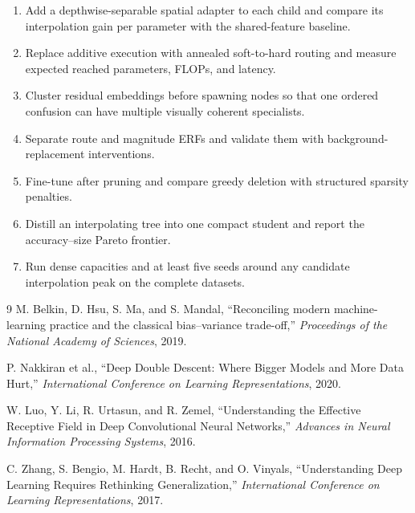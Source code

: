 \documentclass[11pt,a4paper]{article}
\begin{document}
\begin{enumerate}
  \item Add a depthwise-separable spatial adapter to each child and compare its
  interpolation gain per parameter with the shared-feature baseline.
  \item Replace additive execution with annealed soft-to-hard routing and
  measure expected reached parameters, FLOPs, and latency.
  \item Cluster residual embeddings before spawning nodes so that one ordered
  confusion can have multiple visually coherent specialists.
  \item Separate route and magnitude ERFs and validate them with
  background-replacement interventions.
  \item Fine-tune after pruning and compare greedy deletion with structured
  sparsity penalties.
  \item Distill an interpolating tree into one compact student and report the
  accuracy--size Pareto frontier.
  \item Run dense capacities and at least five seeds around any candidate
  interpolation peak on the complete datasets.
\end{enumerate}

\begin{thebibliography}{9}
M. Belkin, D. Hsu, S. Ma, and S. Mandal,
``Reconciling modern machine-learning practice and the classical
bias--variance trade-off,'' \emph{Proceedings of the National Academy of
Sciences}, 2019.

P. Nakkiran et al.,
``Deep Double Descent: Where Bigger Models and More Data Hurt,''
\emph{International Conference on Learning Representations}, 2020.

W. Luo, Y. Li, R. Urtasun, and R. Zemel,
``Understanding the Effective Receptive Field in Deep Convolutional Neural
Networks,'' \emph{Advances in Neural Information Processing Systems}, 2016.

C. Zhang, S. Bengio, M. Hardt, B. Recht, and O. Vinyals,
``Understanding Deep Learning Requires Rethinking Generalization,''
\emph{International Conference on Learning Representations}, 2017.
\end{thebibliography}
\end{document}
